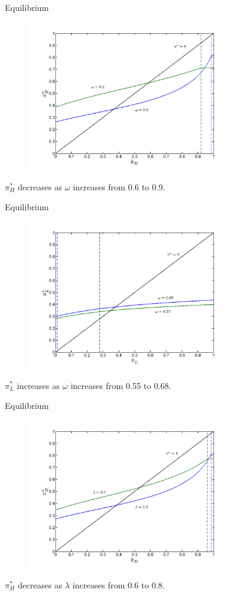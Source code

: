 \documentclass{beamer}
\begin{document}
\begin{frame}{Equilibrium}
\begin{figure}
\centering
\includegraphics[width=0.8\textwidth]{EQ_comp_H_w.png}
\end{figure}
$\pi^{*}_{H}$ decreases as $\omega$ increases from 0.6 to 0.9.
\end{frame}

\begin{frame}{Equilibrium}
\begin{figure}
\centering
\includegraphics[width=0.8\textwidth]{EQ_comp_L_w.png}
\end{figure}
$\pi^{*}_{L}$ increases as $\omega$ increases from 0.55 to 0.68.
\end{frame}

\begin{frame}{Equilibrium}
\begin{figure}
\centering
\includegraphics[width=0.8\textwidth]{EQ_comp_H_l.png}
\end{figure}
$\pi^{*}_{H}$ decreases as $\lambda$ increases from 0.6 to 0.8.
\end{frame}
\end{document}
